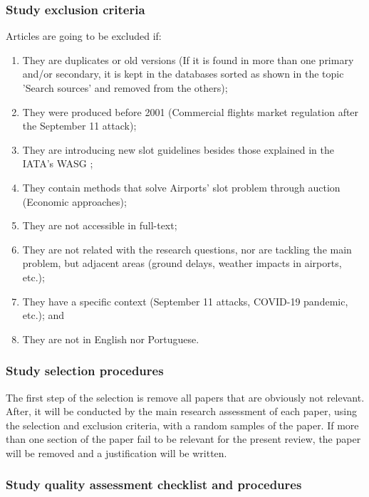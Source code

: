\subsubsection{Study exclusion criteria}

Articles are going to be excluded if: 
\begin{enumerate}
    \item They are duplicates or old versions (If it is found in more than one primary and/or secondary, it is kept in the databases sorted as shown in the topic 'Search sources' and removed from the others);
    \item They were produced before 2001 (Commercial flights market regulation after the September 11 attack);
    \item They are introducing new slot guidelines besides those explained in the IATA's WASG \cite{WASG2020};
    \item They contain methods that solve Airports' slot problem through auction (Economic approaches); 
    \item They are not accessible in full-text;
    \item They are not related with the research questions, nor are tackling the main problem, but adjacent areas (ground delays, weather impacts in airports, etc.);
    \item They have a specific context (September 11 attacks, COVID-19 pandemic, etc.); and
    \item They are not in English nor Portuguese.
\end{enumerate}

\subsubsection{Study selection procedures}

The first step of the selection is remove all papers that are obviously not relevant. After, it will be conducted by the main research assessment of each paper, using the selection and exclusion criteria, with a random samples of the paper. If more than one section of the paper fail to be relevant for the present review, the paper will be removed and a justification will be written.


\subsubsection{Study quality assessment checklist and procedures}


